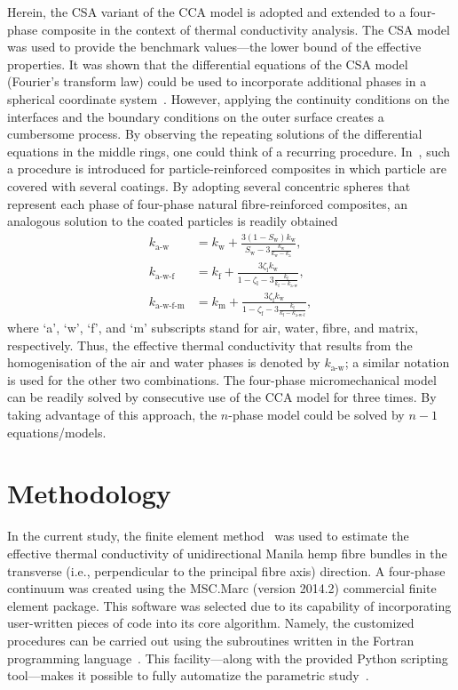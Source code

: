 	Herein, the CSA variant of the CCA model is adopted and extended to a four-phase composite in the context of thermal conductivity analysis. The CSA model was used to provide the benchmark values---the lower bound of the effective properties. It was shown that the differential equations of the CSA model (Fourier's transform law) could be used to incorporate additional phases in a spherical coordinate system~\autocite{Christensen.2012}. However, applying the continuity conditions on the interfaces and the boundary conditions on the outer surface creates a cumbersome process. By observing the repeating solutions of the differential equations in the middle rings, one could think of a recurring procedure. In~\parencite{Milton.2002}, such a procedure is introduced for particle-reinforced composites in which particle are covered with several coatings. By adopting several concentric spheres that represent each phase of four-phase natural fibre-reinforced composites, an analogous solution to the coated particles is readily obtained
	\begin{subequations}
	\begin{align}
		k_{\text{a-w}}     &= k_{\text{w}} + \frac{3(1-S_{\text{w}})k_{\text{w}}}{S_{\text{w}}-3\frac{k_{\text{w}}}{k_{\text{w}}-k_{\text{a}}}},\\\label{eq:airwater}
		k_{\text{a-w-f}}   &= k_{\text{f}} + \frac{3\zeta_{\text{l}}k_{\text{w}}}{1-\zeta_{\text{l}}-3\frac{k_{\text{f}}}{k_{\text{f}}-k_{\text{a-w}}}},\\
		k_{\text{a-w-f-m}} &= k_{\text{m}} + \frac{3\zeta_{\text{f}}k_{\text{w}}}{1-\zeta_{\text{f}}-3\frac{k_{\text{f}}}{k_{\text{f}}-k_{\text{a-w-f}}}},
	\end{align}
	\end{subequations}
	where `a', `w', `f', and `m' subscripts stand for air, water, fibre, and matrix, respectively. Thus, the effective thermal conductivity that results from the homogenisation of the air and water phases is denoted by $k_{\text{a-w}}$; a similar notation is used for the other two combinations. The four-phase micromechanical model can be readily solved by consecutive use of the CCA model for three times. By taking advantage of this approach, the $n$-phase model could be solved by $n-1$ equations/models.

\bl
\section{Methodology}
In the current study, the finite element method~\autocite{Ochsner.2013,Oechsner.2016} was used to estimate the effective thermal conductivity of unidirectional Manila hemp fibre bundles in the transverse (i.e., perpendicular to the principal fibre axis) direction. A four-phase continuum was created using the MSC.Marc (version 2014.2) commercial finite element package. This software was selected due to its capability of incorporating user-written pieces of code into its core algorithm. Namely, the customized procedures can be carried out using the subroutines written in the Fortran programming language~\autocite{Javanbakht.2017}. This facility---along with the provided Python scripting tool---makes it possible to fully automatize the parametric study~\autocite{Javanbakht.2016,Javanbakht.2016b}.

